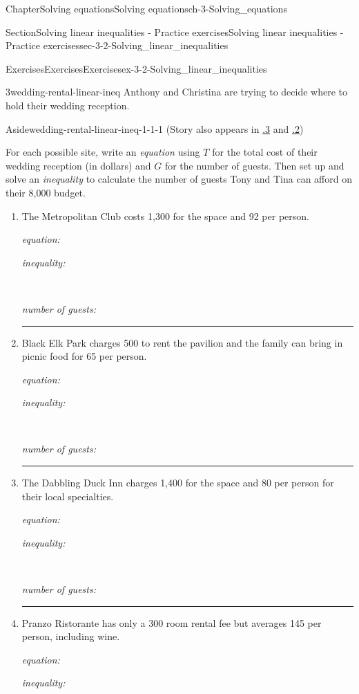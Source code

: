 \documentclass[twoside,11pt,]{book}
\newcommand{\xreffont}{\relax}
\newlength{\workspacestrutwidth}
\numberwithin{equation}{section}
\begin{document}
\begin{chapterptx}{Chapter}{Solving equations}{}{Solving equations}{}{}{ch-3-Solving_equations}
\begin{sectionptx}{Section}{Solving linear inequalities - Practice exercises}{}{Solving linear inequalities - Practice exercises}{}{}{sec-3-2-Solving_linear_inequalities}
\begin{exercises-subsection-numberless}{Exercises}{Exercises}{}{Exercises}{}{}{ex-3-2-Solving_linear_inequalities}
\begin{divisionexercise}{3}{}{}{wedding-rental-linear-ineq}
Anthony and Christina are trying to decide where to hold their wedding reception. \begin{aside}{Aside}{}{wedding-rental-linear-ineq-1-1-1}%
(Story also appears in \hyperlink{wedding-rental-tables-graphs}{{\xreffont 1.2.3}} and \hyperlink{wedding-rental-rate-of-change}{{\xreffont 1.3.2}})%
\end{aside}
 For each possible site, write an \emph{equation} using \(T\) for the total cost of their wedding reception (in dollars) and \(G\) for the number of guests. Then set up and solve an \emph{inequality} to calculate the number of guests Tony and Tina can afford on their \textdollar{}8,000 budget.%
\begin{enumerate}[label=(\alph*),ref=\alph*]%
\item{}The Metropolitan Club costs \textdollar{}1,300 for the space and \textdollar{}92 per person.%
\par
\emph{equation:}%
\par
\emph{inequality:}%
\par
~%
\par
\emph{number of guests:}%
\par\rule{\workspacestrutwidth}{0.5cm}%
\item{}Black Elk Park charges \textdollar{}500 to rent the pavilion and the family can bring in picnic food for \textdollar{}65 per person.%
\par
\emph{equation:}%
\par
\emph{inequality:}%
\par
~%
\par
\emph{number of guests:}%
\par\rule{\workspacestrutwidth}{0.5cm}%
\item{}The Dabbling Duck Inn charges \textdollar{}1,400 for the space and \textdollar{}80 per person for their local specialties.%
\par
\emph{equation:}%
\par
\emph{inequality:}%
\par
~%
\par
\emph{number of guests:}%
\par\rule{\workspacestrutwidth}{0.5cm}%
\item{}Pranzo Ristorante has only a \textdollar{}300 room rental fee but averages \textdollar{}145 per person, including wine.%
\par
\emph{equation:}%
\par
\emph{inequality:}%
\par
~%
\par

\end{enumerate}
\end{divisionexercise}
\end{exercises-subsection-numberless}
\end{sectionptx}
\end{chapterptx}
\end{document}

